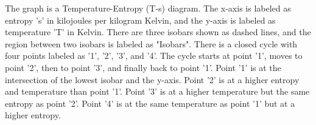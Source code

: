 The graph is a Temperature-Entropy (T-s) diagram. The x-axis is labeled as entropy 's' in kilojoules per kilogram Kelvin, and the y-axis is labeled as temperature 'T' in Kelvin. There are three isobars shown as dashed lines, and the region between two isobars is labeled as "Isobars". There is a closed cycle with four points labeled as '1', '2', '3', and '4'. The cycle starts at point '1', moves to point '2', then to point '3', and finally back to point '1'. Point '1' is at the intersection of the lowest isobar and the y-axis. Point '2' is at a higher entropy and temperature than point '1'. Point '3' is at a higher temperature but the same entropy as point '2'. Point '4' is at the same temperature as point '1' but at a higher entropy.